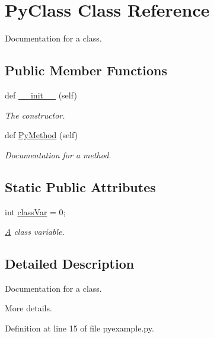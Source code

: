 \hypertarget{classpyexample_1_1_py_class}{}\section{Py\+Class Class Reference}
\label{classpyexample_1_1_py_class}


Documentation for a class.  


\subsection*{Public Member Functions}
\begin{DoxyCompactItemize}
\item 
def \hyperlink{classpyexample_1_1_py_class_ae64f0875afe3067b97ba370b354b9213}{\+\_\+\+\_\+init\+\_\+\+\_\+} (self)
\begin{DoxyCompactList}\small\item\em The constructor. \end{DoxyCompactList}\item 
def \hyperlink{classpyexample_1_1_py_class_a06331a3bf023b9e7a180422e737b0381}{Py\+Method} (self)
\begin{DoxyCompactList}\small\item\em Documentation for a method. \end{DoxyCompactList}\end{DoxyCompactItemize}
\subsection*{Static Public Attributes}
\begin{DoxyCompactItemize}
\item 
int \hyperlink{classpyexample_1_1_py_class_af4cea5ee982f0598f7393af0cd670fc5}{class\+Var} = 0;
\begin{DoxyCompactList}\small\item\em \hyperlink{class_a}{A} class variable. \end{DoxyCompactList}\end{DoxyCompactItemize}


\subsection{Detailed Description}
Documentation for a class. 

More details. 

Definition at line 15 of file pyexample.\+py.



